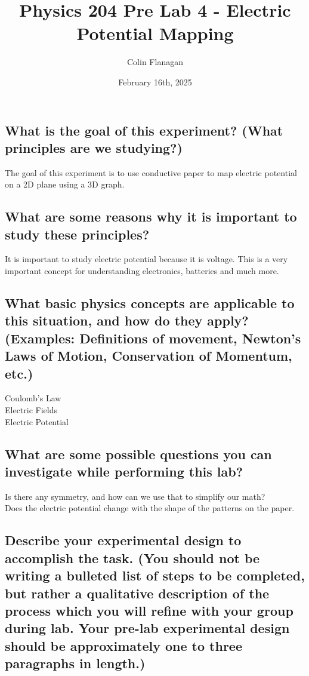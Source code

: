 \documentclass{article}
\title{Physics 204 Pre Lab 4 - Electric Potential Mapping}
\author{Colin Flanagan}
\date{February 16th, 2025}
\begin{document}
\maketitle

\subsection*{What is the goal of this experiment? (What principles are we studying?)}

    The goal of this experiment is to use conductive paper to map electric potential on a 2D plane using a 3D graph.

\subsection*{What are some reasons why it is important to study these principles?
}

  It is important to study electric potential because it is voltage. This is a very important concept for understanding electronics, batteries and much more.
    
\subsection*{What basic physics concepts are applicable to this situation, and how do they apply? (Examples: Definitions of movement, Newton’s Laws of Motion, Conservation of Momentum, etc.)}

    Coulomb's Law\\

    Electric Fields\\

    Electric Potential\\


\subsection*{What are some possible questions you can investigate while performing this lab?
}

   Is there any symmetry, and how can we use that to simplify our math?\\

   Does the electric potential change with the shape of the patterns on the paper.\\


\subsection*{Describe your experimental design to accomplish the task. (You should not be writing a bulleted list of steps to be completed, but rather a qualitative description of the process which you will refine with your group during lab. Your pre-lab experimental design should be approximately one to three paragraphs in length.)}
\end{document}
